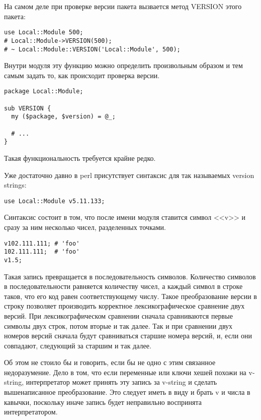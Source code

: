 На самом деле при проверке версии пакета вызвается метод VERSION этого пакета: %
\begin{verbatim}
use Local::Module 500;
# Local::Module->VERSION(500);
# ~ Local::Module::VERSION('Local::Module', 500);
\end{verbatim}
Внутри модуля эту функцию можно определить произвольным образом и тем самым задать то, как происходит проверка версии.
\begin{verbatim}
package Local::Module;

sub VERSION {
  my ($package, $version) = @_;

  # ...
}
\end{verbatim}
Такая функциональность требуется крайне редко.

Уже достаточно давно в perl присутствует синтаксис для так называемых version strings:
\begin{verbatim}
use Local::Module v5.11.133;
\end{verbatim}
Синтаксис состоит в том, что после имени модуля ставится символ <<v>> и сразу за ним несколько чисел, разделенных точками.
\begin{verbatim}
v102.111.111; # 'foo'
102.111.111;  # 'foo'
v1.5;
\end{verbatim}

Такая запись превращается в последовательность символов. Количество символов в последовательности равняется количеству чисел, а каждый символ в строке таков, что его код равен соответствующему числу. Такое преобразование версии в строку позволяет производить корректное лексикографическое сравнение двух версий. При лексикографическом сравнении сначала сравниваются первые символы двух строк, потом вторые и так далее. Так и при сравнении двух номеров версий сначала будут сравниваться старшие номера версий, и, если они совпадают, следующий за старшим и так далее.

Об этом не стоило бы и говорить, если бы не одно с этим связанное недоразумение. Дело в том, что если переменные или ключи хешей похожи на v-string, интерпретатор может принять эту запись за v-string и сделать вышенаписанное преобразование. Это следует иметь в виду и брать v и числа в кавычки, поскольку иначе запись будет неправильно воспринята интерпретатором.

